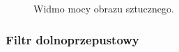 \documentclass{classrep}
\begin{document}
 \begin{figure}[H]
  \centering
  \caption{Widmo mocy obrazu sztucznego.}
  \label{fig_pattern}
\end{figure}




\subsubsection{Filtr dolnoprzepustowy}
\end{document}

